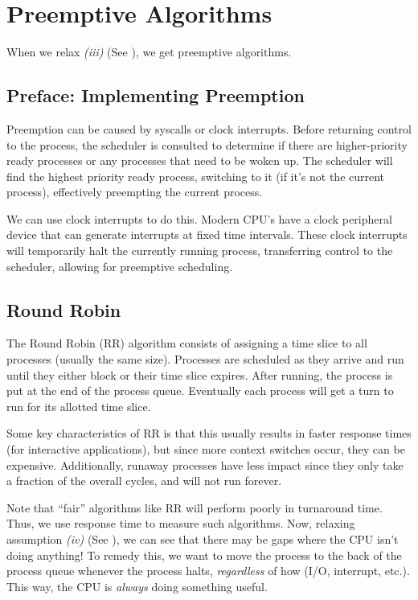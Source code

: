 \documentclass{report}
\newcommand{\bookBegin}[1]{\begin{tcolorbox}[colback=black!5!white,colframe=black!75!black,title={\textit{Operating Systems, Three Easy Pieces: #1}}]}
\newcommand{\bookEnd}{\end{tcolorbox}}
\begin{document}
\section{Preemptive Algorithms}
\bookBegin{Preemptive Algorithms}
When we relax \textit{(iii)} (See \textbf{}), we get preemptive algorithms.
\bookEnd


\subsection*{Preface: Implementing Preemption}
Preemption can be caused by syscalls or clock interrupts. Before returning control to the process,
the scheduler is consulted to determine if there are higher-priority ready processes or any
processes that need to be woken up. The scheduler will find the highest priority ready process,
switching to it (if it's not the current process), effectively preempting the current process.

We can use clock interrupts to do this. Modern CPU's have a clock peripheral device that can
generate interrupts at fixed time intervals. These clock interrupts will temporarily halt the
currently running process, transferring control to the scheduler, allowing for preemptive scheduling.


\subsection{Round Robin}
\label{subsubsec:RR}
The Round Robin (RR) algorithm consists of assigning a time slice to all processes (usually the same
size). Processes are scheduled as they arrive and run until they either block or their time slice
expires. After running, the process is put at the end of the process queue. Eventually each process
will get a turn to run for its allotted time slice.

Some key characteristics of RR is that this usually results in faster response times (for
interactive applications), but since more context switches occur, they can be
expensive. Additionally, runaway processes have less impact since they only take a fraction of the
overall cycles, and will not run forever.

\bookBegin{Round Robin}
Note that ``fair'' algorithms like RR will perform poorly in turnaround time. Thus, we use response
time to measure such algorithms. Now, relaxing assumption \textit{(iv)} (See
\textbf{}), we can see that there may be gaps where the CPU isn't doing
anything! To remedy this, we want to move the process to the back of the process queue whenever the
process halts, \textit{regardless} of how (I/O, interrupt, etc.). This way, the CPU is
\textit{always} doing something useful.
\bookEnd
\end{document}
